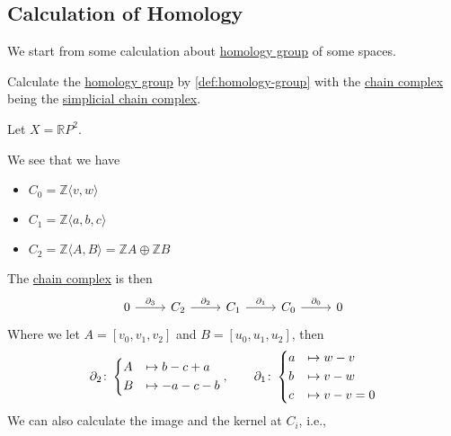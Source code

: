 \subsection{Calculation of Homology}
We start from some calculation about \hyperref[def:homology-group]{homology group} of some spaces.

\begin{eg}
	Calculate the \hyperref[def:homology-group]{homology group} by \autoref{def:homology-group} with the \hyperref[def:chain-complex]{chain complex} being the \hyperref[def:simplicial-complex]{simplicial chain complex}.
\end{eg}
\begin{explanation}
	Let \(X = \mathbb{R} P^{2} \).
	\begin{figure}[H]
		\centering
		\label{fig:eg:homology-RP2}
	\end{figure}
	We see that we have
	\begin{itemize}
		\item \(C_0 = \mathbb{Z} \langle v, w \rangle \)
		\item \(C_1 = \mathbb{Z} \langle a, b, c \rangle \)
		\item \(C_2 = \mathbb{Z} \langle A, B \rangle = \mathbb{Z} A \oplus \mathbb{Z} B\)
	\end{itemize}
	The \hyperref[def:chain-complex]{chain complex} is then
	\[
		\begin{tikzcd}
			0 & {C_2} & {C_1} & {C_0} & 0
			\arrow["{\partial_3}", from=1-1, to=1-2]
			\arrow["{\partial_2}", from=1-2, to=1-3]
			\arrow["{\partial_1}", from=1-3, to=1-4]
			\arrow["{\partial_0}", from=1-4, to=1-5]
		\end{tikzcd}
	\]
	Where we let \(A = [v_0, v_1, v_2]\) and \(B = [u_0, u_1, u_2]\), then
	\[
		\partial_2\colon \begin{dcases}
			A & \mapsto b - c + a \\
			B & \mapsto -a-c-b    \\
		\end{dcases},\qquad \partial_1\colon \begin{dcases}
			a & \mapsto w - v     \\
			b & \mapsto v - w     \\
			c & \mapsto v - v = 0 \\
		\end{dcases}
	\]
	We can also calculate the image and the kernel at \(C_{i} \), i.e.,

\end{explanation}
